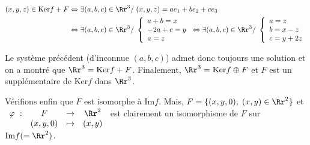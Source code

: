 {\begin{enumerate}
{\begin{align*}
(x,y,z)\in\mbox{Ker}f+F&\Leftrightarrow\exists(a,b,c)\in\Rr^3/\;(x,y,z)=ae_1+be_2+ce_3\\
 &\Leftrightarrow\exists(a,b,c)\in\Rr^3/\;
\left\{
\begin{array}{l}
a+b=x\\
-2a+c=y\\
a=z
\end{array}
\right.
\Leftrightarrow
\exists(a,b,c)\in\Rr^3/\;\left\{
\begin{array}{l}
a=z\\
b=x-z\\
c=y+2z
\end{array}
\right.
\end{align*}

Le système précédent (d'inconnue $(a,b,c)$) admet donc toujours une solution et on a montré que $\Rr^3=\mbox{Ker}f+F$.
Finalement, $\Rr^3=\mbox{Ker}f\oplus F$ et $F$ est un supplémentaire de $\mbox{Ker}f$ dans $\Rr^3$.

Vérifions enfin que $F$ est isomorphe à $\mbox{Im}f$. Mais, $F=\{(x,y,0),\;(x,y)\in\Rr^2\}$ et
$\begin{array}[t]{cccc}
\varphi~:&F&\rightarrow&\Rr^2\\
 &(x,y,0)&\mapsto&(x,y)
\end{array}$ est clairement un isomorphisme de $F$ sur $\mbox{Im}f(=\Rr^2)$.}
\end{enumerate}
}
